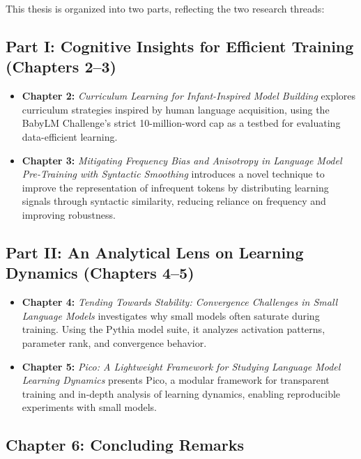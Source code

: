 This thesis is organized into two parts, reflecting the two research threads:

\subsection*{Part I: Cognitive Insights for Efficient Training (Chapters 2–3)}

\begin{itemize}
    \item \textbf{Chapter 2:} \emph{Curriculum Learning for Infant-Inspired Model Building}  
    explores curriculum strategies inspired by human language acquisition, using the BabyLM Challenge's strict 10-million-word cap as a testbed for evaluating data-efficient learning.

    \item \textbf{Chapter 3:} \emph{Mitigating Frequency Bias and Anisotropy in Language Model Pre-Training with Syntactic Smoothing}  
    introduces a novel technique to improve the representation of infrequent tokens by distributing learning signals through syntactic similarity, reducing reliance on frequency and improving robustness.
\end{itemize}

\subsection*{Part II: An Analytical Lens on Learning Dynamics (Chapters 4–5)}

\begin{itemize}
    \item \textbf{Chapter 4:} \emph{Tending Towards Stability: Convergence Challenges in Small Language Models}  
    investigates why small models often saturate during training. Using the Pythia model suite, it analyzes activation patterns, parameter rank, and convergence behavior.

    \item \textbf{Chapter 5:} \emph{Pico: A Lightweight Framework for Studying Language Model Learning Dynamics}  
    presents Pico, a modular framework for transparent training and in-depth analysis of learning dynamics, enabling reproducible experiments with small models.
\end{itemize}

\subsection*{Chapter 6: Concluding Remarks}

